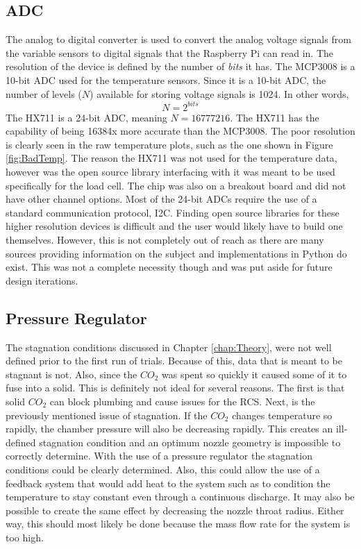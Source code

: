 \subsection{ADC}
The analog to digital converter is used to convert the analog voltage signals from the variable sensors to digital signals that the Raspberry Pi can read in. The resolution of the device is defined by the number of \textit{bits} it has. The MCP3008 is a 10-bit ADC used for the temperature sensors. Since it is a 10-bit ADC, the number of levels ($N$) available for storing voltage signals is 1024. In other words,
\begin{equation}
N=2^{bits}
\end{equation}
The HX711 is a 24-bit ADC, meaning $N=16777216$. The HX711 has the capability of being 16384x more accurate than the MCP3008. The poor resolution is clearly seen in the raw temperature plots, such as the one shown in Figure \ref{fig:BadTemp}. The reason the HX711 was not used for the temperature data, however was the open source library interfacing with it was meant to be used specifically for the load cell. The chip was also on a breakout board and did not have other channel options. Most of the 24-bit ADCs require the use of a standard communication protocol, I2C. Finding open source libraries for these higher resolution devices is difficult and the user would likely have to build one themselves. However, this is not completely out of reach as there are many sources providing information on the subject and implementations in Python do exist. This was not a complete necessity though and was put aside for future design iterations.
\subsection{Pressure Regulator}
The stagnation conditions discussed in Chapter \ref{chap:Theory}, were not well defined prior to the first run of trials. Because of this, data that is meant to be stagnant is not. Also, since the $CO_2$ was spent so quickly it caused some of it to fuse into a solid. This is definitely not ideal for several reasons. The first is that solid $CO_2$ can block plumbing and cause issues for the RCS. Next, is the previously mentioned issue of stagnation. If the $CO_2$ changes temperature so rapidly, the chamber pressure will also be decreasing rapidly. This creates an ill-defined stagnation condition and an optimum nozzle geometry is impossible to correctly determine. With the use of a pressure regulator the stagnation conditions could be clearly determined. Also, this could allow the use of a feedback system that would add heat to the system such as to condition the temperature to stay constant even through a continuous discharge. It may also be possible to create the same effect by decreasing the nozzle throat radius. Either way, this should most likely be done because the mass flow rate for the system is too high.
